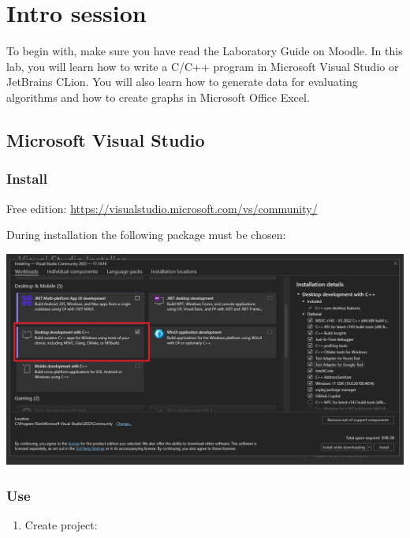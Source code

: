 \documentclass[../en-fa-lab.tex]{subfiles}
\begin{document}
\section{\texorpdfstring{\textbf{Intro session}}{Intro session}}\label{intro-session}

To begin with, make sure you have read the Laboratory Guide on
Moodle. In this lab, you will learn how to write a C/C++ program in
Microsoft Visual Studio or JetBrains CLion. You will also learn how to
generate data for evaluating algorithms and how to create graphs in
Microsoft Office
Excel.

\subsection{Microsoft Visual Studio}\label{microsoft-visual-studio}

\subsubsection{Install}\label{install}

Free edition: \url{https://visualstudio.microsoft.com/vs/community/}

During installation the following package must be chosen:

\includegraphics[width=\textwidth]{../Resources/lab0/vs_components.png}

\subsubsection{Use}\label{use}

\begin{enumerate}
\def\labelenumi{\arabic{enumi}.}
\item
    Create project:
\end{enumerate}
\end{document}
